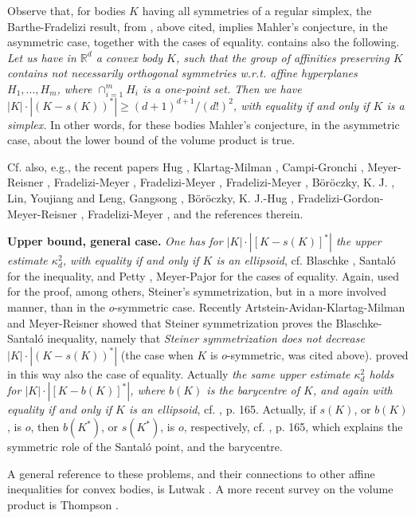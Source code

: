 \documentclass[12pt]{article}
\newcommand{\R}{\mathbb{R}}
\begin{document}
Observe that, for bodies $K$ having all symmetries of a regular simplex, the
Barthe-Fradelizi result, from \cite{BF}, above cited,
implies Mahler's conjecture, in the asymmetric case,
together with the cases of equality. 
\cite{BF} contains also the following. {\it{Let us have in ${\R}^d$
a convex body $K$, such that the group of affinities preserving $K$
contains not necessarily orthogonal symmetries w.r.t. affine hyperplanes
$H_1,...,H_m$, where $\cap _{i=1}^m H_i$ is a one-point set. Then we have
$|K| \cdot | \left( K-s(K) \right) ^* | \ge (d+1)^{d+1}/(d!)^2$, with equality 
if and only if $K$ is a simplex.}} In other words, for these bodies Mahler's
conjecture, in the asymmetric case, 
about the lower bound of the volume product is true.
 
Cf. also, e.g., the recent papers Hug \cite{H}, Klartag-Milman \cite{KM},
Campi-Gronchi \cite{CG},
Meyer-Reisner \cite{MR06}, Fradelizi-Meyer \cite{FM07}, 
Fradelizi-Meyer \cite{FM08a}, Fradelizi-Meyer \cite{FM08b}, B\"or\"oczky, K. J.
\cite{Bo}, Lin, Youjiang and Leng, Gangsong \cite{LL}, 
B\"or\"oczky, K. J.-Hug \cite{BH}, 
Fradelizi-Gordon-Meyer-Reisner \cite{FGMR}, Fradelizi-Meyer
\cite{FM}, and the references therein.

{\bf{Upper bound, general case.}}
{\it{One has for 
$|K| \cdot | [ K-s(K) ] ^* | $ the
upper estimate $\kappa _d ^2$, with equality if and only if $K$ is an
ellipsoid}}, cf. Blaschke \cite{Bl}, Santal\'o \cite{San} 
for the inequality, and Petty \cite{Pe}, Meyer-Pajor \cite{MP90} 
for the cases of
equality. Again, \cite{MP90} used for the proof, among others, 
Steiner's symmetrization, but in a more involved manner, than in the
$o$-symmetric case. Recently Artstein-Avidan-Klartag-Milman \cite{A-AKM} and
Meyer-Reisner \cite{MR06} showed that Steiner
symmetrization proves the Blaschke-Santal\'o inequality, namely that 
{\it{Steiner
symmetrization does not decrease}} $|K| \cdot |(K-s(K))^*|$ (the case when $K$
is $o$-symmetric, was cited above). \cite{MR06}
proved in this way also the case of equality.
Actually {\it{the same upper estimate $\kappa _d ^2$ holds for 
$|K| \cdot | [K-b(K)] ^* |$, 
where $b(K)$ is the barycentre of $K$,
and again with equality if and only if $K$ is an
ellipsoid}}, cf. \cite{L}, p. 165. Actually, if $s(K)$, or $b(K)$, is $o$,
then $b(K^*)$, or $s(K^*)$, is $o$, respectively, cf. \cite{L}, p. 165, 
which explains the symmetric
role of the Santal\'o point, and the barycentre.

A general reference to these problems, and their connections to other affine
inequalities for convex bodies, 
is Lutwak \cite{L}. A more recent survey on the volume product
is Thompson \cite{Th07}.
\end{document}
